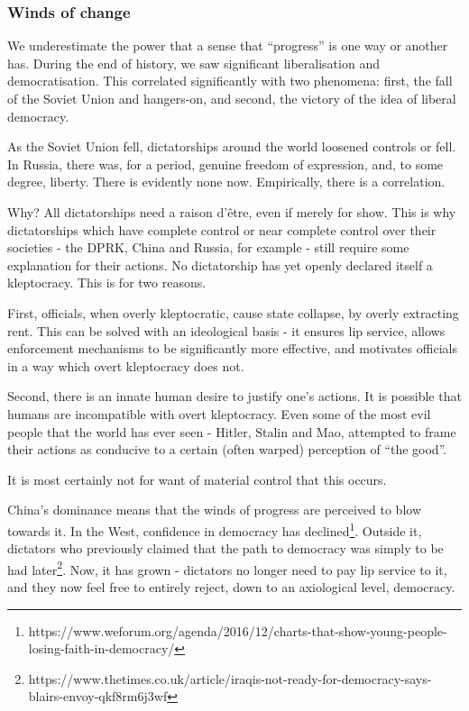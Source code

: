 \subsubsection{Winds of change}\label{winds-of-change}

	We underestimate the power that a sense that ``progress'' is one way or
	another has. During the end of history, we saw significant
	liberalisation and democratisation. This correlated significantly with
	two phenomena: first, the fall of the Soviet Union and hangers-on, and
	second, the victory of the idea of liberal democracy.

	As the Soviet Union fell, dictatorships around the world loosened
	controls or fell. In Russia, there was, for a period, genuine freedom of
	expression, and, to some degree, liberty. There is evidently none now.
	Empirically, there is a correlation.

	Why? All dictatorships need a raison d'être, even if merely for show.
	This is why dictatorships which have complete control or near complete
	control over their societies - the DPRK, China and Russia, for example -
	still require some explanation for their actions. No dictatorship has
	yet openly declared itself a kleptocracy. This is for two reasons.

	First, officials, when overly kleptocratic, cause state collapse, by
	overly extracting rent. This can be solved with an ideological basis -
	it ensures lip service, allows enforcement mechanisms to be
	significantly more effective, and motivates officials in a way which
	overt kleptocracy does not.

	Second, there is an innate human desire to justify one's actions. It is
	possible that humans are incompatible with overt kleptocracy. Even some
	of the most evil people that the world has ever seen - Hitler, Stalin
	and Mao, attempted to frame their actions as conducive to a certain
	(often warped) perception of ``the good''.

	It is most certainly not for want of material control that this occurs.

	China's dominance means that the winds of progress are perceived to blow
	towards it. In the West, confidence in democracy has declined\footnote{https://www.weforum.org/agenda/2016/12/charts-that-show-young-people-losing-faith-in-democracy/}.
	Outside it, dictators who previously claimed that the path to democracy
	was simply to be had later\footnote{https://www.thetimes.co.uk/article/iraqis-not-ready-for-democracy-says-blairs-envoy-qkf8rm6j3wf}.
	Now, it has grown - dictators no longer need to pay lip service to it,
	and they now feel free to entirely reject, down to an axiological level,
	democracy.

